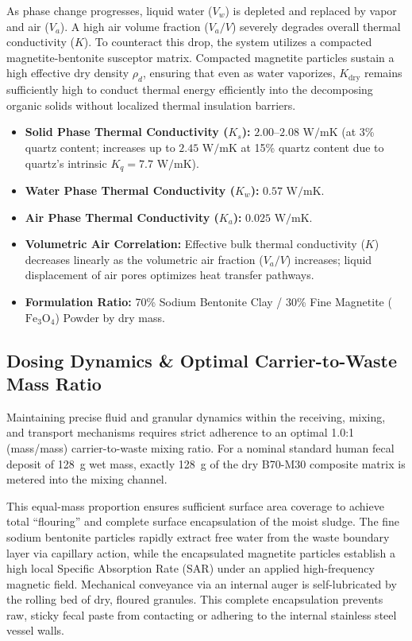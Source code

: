 \documentclass[10pt,twocolumn,a4paper]{article}
\begin{document}
As phase change progresses, liquid water ($V_w$) is depleted and replaced by vapor and air ($V_a$). A high air volume fraction ($V_a/V$) severely degrades overall thermal conductivity ($K$). To counteract this drop, the system utilizes a compacted magnetite-bentonite susceptor matrix. Compacted magnetite particles sustain a high effective dry density $\rho_d$, ensuring that even as water vaporizes, $K_{\text{dry}}$ remains sufficiently high to conduct thermal energy efficiently into the decomposing organic solids without localized thermal insulation barriers.

\begin{itemize}[leftmargin=*]
    \item \textbf{Solid Phase Thermal Conductivity ($K_s$):} $2.00\text{--}2.08\text{ W/mK}$ (at 3\% quartz content; increases up to $2.45\text{ W/mK}$ at 15\% quartz content due to quartz's intrinsic $K_q = 7.7\text{ W/mK}$).
    \item \textbf{Water Phase Thermal Conductivity ($K_w$):} $0.57\text{ W/mK}$.
    \item \textbf{Air Phase Thermal Conductivity ($K_a$):} $0.025\text{ W/mK}$.
    \item \textbf{Volumetric Air Correlation:} Effective bulk thermal conductivity ($K$) decreases linearly as the volumetric air fraction ($V_a/V$) increases; liquid displacement of air pores optimizes heat transfer pathways.
    \item \textbf{Formulation Ratio:} 70\% Sodium Bentonite Clay / 30\% Fine Magnetite ($\text{Fe}_3\text{O}_4$) Powder by dry mass.
\end{itemize}

\subsection{Dosing Dynamics \& Optimal Carrier-to-Waste Mass Ratio}

Maintaining precise fluid and granular dynamics within the receiving, mixing, and transport mechanisms requires strict adherence to an optimal 1.0:1 (mass/mass) carrier-to-waste mixing ratio. For a nominal standard human fecal deposit of 128~g wet mass, exactly 128~g of the dry B70-M30 composite matrix is metered into the mixing channel.

This equal-mass proportion ensures sufficient surface area coverage to achieve total ``flouring'' and complete surface encapsulation of the moist sludge. The fine sodium bentonite particles rapidly extract free water from the waste boundary layer via capillary action, while the encapsulated magnetite particles establish a high local Specific Absorption Rate (SAR) under an applied high-frequency magnetic field. Mechanical conveyance via an internal auger is self-lubricated by the rolling bed of dry, floured granules. This complete encapsulation prevents raw, sticky fecal paste from contacting or adhering to the internal stainless steel vessel walls.
\end{document}
